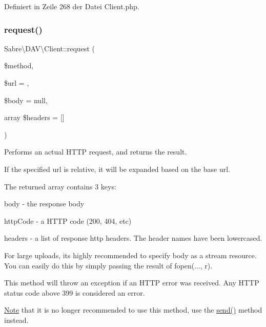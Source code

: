 Definiert in Zeile 268 der Datei Client.\+php.

\mbox{\label{class_sabre_1_1_d_a_v_1_1_client_a6255d861b39ab83e7807d3c3f5503829}} 
\subsubsection{\texorpdfstring{request()}{request()}}
{\footnotesize\ttfamily Sabre\textbackslash{}\+D\+A\+V\textbackslash{}\+Client\+::request (\begin{DoxyParamCaption}\item[{}]{\$method,  }\item[{}]{\$url = {\ttfamily \textquotesingle{}\textquotesingle{}},  }\item[{}]{\$body = {\ttfamily null},  }\item[{array}]{\$headers = {\ttfamily \mbox{[}\mbox{]}} }\end{DoxyParamCaption})}

Performs an actual H\+T\+TP request, and returns the result.

If the specified url is relative, it will be expanded based on the base url.

The returned array contains 3 keys\+:
\begin{DoxyItemize}
\item body -\/ the response body
\item http\+Code -\/ a H\+T\+TP code (200, 404, etc)
\item headers -\/ a list of response http headers. The header names have been lowercased.
\end{DoxyItemize}

For large uploads, it\textquotesingle{}s highly recommended to specify body as a stream resource. You can easily do this by simply passing the result of fopen(..., \textquotesingle{}r\textquotesingle{}).

This method will throw an exception if an H\+T\+TP error was received. Any H\+T\+TP status code above 399 is considered an error.

\mbox{\hyperlink{class_note}{Note}} that it is no longer recommended to use this method, use the \mbox{\hyperlink{class_sabre_1_1_h_t_t_p_1_1_client_a7f3519f925a27ff12cf4bfa2c6980d92}{send()}} method instead.


